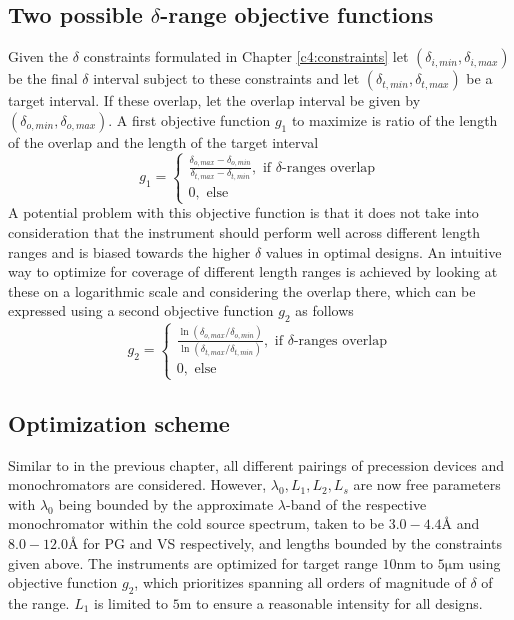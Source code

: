 \documentclass{article}
\begin{document}
\subsection{Two possible $\delta$-range objective functions}
\label{c5.2}
Given the $\delta$ constraints formulated in Chapter \ref{c4:constraints} let $(\delta_{i, min},\delta_{i, max})$ be the final $\delta$ interval subject to these constraints and let $(\delta_{t, min},\delta_{t, max})$ be a target interval. If these overlap, let the overlap interval be given by $(\delta_{o, min},\delta_{o, max})$. A first objective function $g_1$ to maximize is ratio of the length of the overlap and the length of the target interval
$$g_1 = \begin{cases}
	\frac{\delta_{o, max}-\delta_{o, min}}{\delta_{t, max} - \delta_{t, min}},\text{ if $\delta$-ranges overlap}\\
	0,\text{ else}
\end{cases}$$
A potential problem with this objective function is that it does not take into consideration that the instrument should perform well across different length ranges and is biased towards the higher $\delta$ values in optimal designs. An intuitive way to optimize for coverage of different length ranges is achieved by looking at these on a logarithmic scale and considering the overlap there, which can be expressed using a second objective function $g_2$ as follows 
$$g_2 = \begin{cases}
	\frac{\ln(\delta_{o, max}/\delta_{o, min})}{\ln(\delta_{t, max}/\delta_{t, min})},\text{ if $\delta$-ranges overlap}\\
	0,\text{ else}
\end{cases}$$

\subsection{Optimization scheme}
\label{c5.3}
Similar to in the previous chapter, all different pairings of precession devices and monochromators are considered. However, $\lambda_0, L_1, L_2, L_s$ are now free parameters with $\lambda_0$ being bounded by the approximate $\lambda$-band of the respective monochromator within the cold source spectrum, taken to be $3.0 - 4.4$Å and $8.0 - 12.0$Å for PG and VS respectively, and lengths bounded by the constraints given above. 
The instruments are optimized for target range $10 \unit{\nano\meter}$ to $5 \unit{\micro\meter}$ using objective function $g_2$, which prioritizes spanning all orders of magnitude of $\delta$ of the range. $L_1$ is limited to $5 \unit\meter$ to ensure a reasonable intensity for all designs. 
\end{document}
